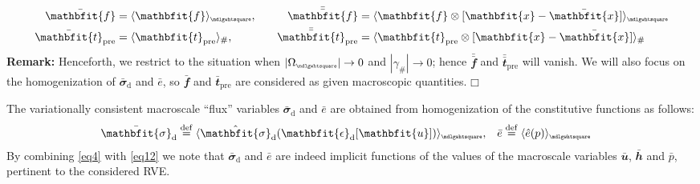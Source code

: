 \documentclass[12pt,a4paper]{article}
\renewcommand{\ta}[1]{\mathbfit{#1}}
\renewcommand{\ts}[1]{\mathbfit{#1}}
\renewcommand{\Box}{\mdlgwhtsquare}
\DeclarePairedDelimiter{\homgen}{\langle}{\rangle_\rve}
\newcommand{\prescribed}{\mathrm{pre}}
\renewcommand{\dev}{\mathrm{d}}
\newcommand{\volume}{|\Omega_\rve|}
\newcommand{\rve}{
  {\mathchoice
   {\mbox{\scalebox{0.67}{$\Box$}}}
   {\mbox{\scalebox{0.67}{$\Box$}}}
   {\mbox{\scalebox{0.5}{$\Box$}}}
   {\mbox{\scalebox{0.375}{$\Box$}}}
  }
}
\begin{document}
\begin{alignat}{2}
    \bar{\ta f} &= \homgen{ \ta{f} },\quad
    &\bar{\bar{\ta f}} &= \homgen{ \ta{f}\outerp[\ta{x}-\bar{\ta{x}}] }
\label{eq15fa}
\\
    \bar{\ta t}_\prescribed &= \langle \ta{t}_\prescribed \rangle_\#,\quad
    &\bar{\bar{\ta t}}_\prescribed &= \langle \ta{t}_\prescribed\outerp[\ta{x}-\bar{\ta{x}}]  \rangle_\#
\end{alignat}
\textbf{Remark:} Henceforth, we restrict to the situation when $\volume\to 0$ and $|\gamma_\#|\to 0$; hence $\bar{\bar{\ta f}}$ and $\bar{\bar{\ta t}}_\prescribed$ will vanish.
We will also focus on the homogenization of $\bar{\ts\sigma}_\dev$ and $\bar{e}$, so $\bar{\ta f}$ and $\bar{\ta t}_\prescribed$ are considered as given macroscopic quantities. $\Box$

The variationally consistent macroscale ``flux'' variables $\bar{\ts{\sigma}}_\dev$ and $\bar{e}$ are obtained from homogenization of the constitutive functions as follows:
\begin{align}
    \bar{\ts{\sigma}}_\dev &\defeq \homgen{ \hat{\ts{\sigma}}_\dev(\ts{\epsilon}_\dev[\ta{u}]) }, &
    \bar{e} &\defeq \homgen{ \hat{e}(p) }
\label{eq16}
\end{align}
By combining \cref{eq4} with \cref{eq12} we note that $\bar{\ts\sigma}_\dev$ and $\bar{e}$ are indeed implicit functions of the values of the macroscale variables $\bar{\ta u}$, $\bar{\ts h}$ and $\bar{p}$, pertinent to the considered RVE.
\end{document}

